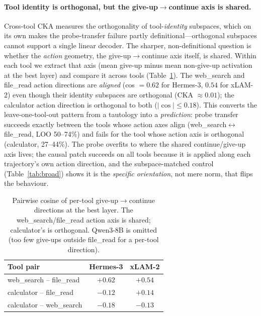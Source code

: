 \documentclass{article}
\begin{document}
\paragraph{Tool identity is orthogonal, but the give-up$\to$continue axis is shared.}
Cross-tool CKA measures the orthogonality of tool-\emph{identity} subspaces, which on its
own makes the probe-transfer failure partly definitional---orthogonal subspaces cannot
support a single linear decoder. The sharper, non-definitional question is whether the
\emph{action} geometry, the give-up$\to$continue axis itself, is shared. Within each tool
we extract that axis (mean give-up minus mean non-give-up activation at the best layer)
and compare it across tools (Table~\ref{tab:actiondir}). The web\_search and file\_read
action directions are \emph{aligned} (cos $=0.62$ for Hermes-3, $0.54$ for xLAM-2) even
though their identity subspaces are orthogonal (CKA $\approx 0.01$); the calculator action
direction is orthogonal to both ($|\cos|\leq 0.18$). This converts the leave-one-tool-out
pattern from a tautology into a \emph{prediction}: probe transfer succeeds exactly between
the tools whose action axes align (web\_search$\leftrightarrow$file\_read, LOO 50--74\%)
and fails for the tool whose action axis is orthogonal (calculator, 27--44\%). The probe
overfits to where the shared continue/give-up axis lives; the causal patch succeeds on all
tools because it is applied along each trajectory's own action direction, and the
subspace-matched control (Table~\ref{tab:broad}) shows it is the \emph{specific
orientation}, not mere norm, that flips the behaviour.

\begin{table}[h]
\caption{Pairwise cosine of per-tool give-up$\to$continue directions at the best layer.
The web\_search/file\_read action axis is shared; calculator's is orthogonal.
Qwen3-8B is omitted (too few give-ups outside file\_read for a per-tool direction).}
\label{tab:actiondir}
\centering\small
\begin{tabular}{lcc}
\toprule
Tool pair & Hermes-3 & xLAM-2 \\
\midrule
web\_search -- file\_read & $+0.62$ & $+0.54$ \\
calculator -- file\_read  & $-0.12$ & $+0.14$ \\
calculator -- web\_search & $-0.18$ & $-0.13$ \\
\bottomrule
\end{tabular}
\end{table}
\end{document}
